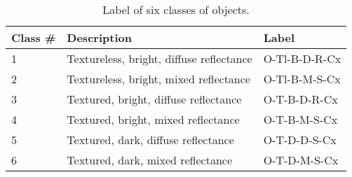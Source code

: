 \begin{table}[!htbp]
\centering
\begin{tabular}{ll|l}
\toprule
Class \# & Description & Label\\
\midrule
1 & Textureless, bright, diffuse reflectance & O-Tl-B-D-R-Cx\\
2 & Textureless, bright, mixed reflectance & O-Tl-B-M-S-Cx\\
3 & Textured, bright, diffuse reflectance & O-T-B-D-R-Cx\\
4 & Textured, bright, mixed reflectance & O-T-B-M-S-Cx\\
5 & Textured, dark, diffuse reflectance & O-T-D-D-S-Cx\\
6 & Textured, dark, mixed reflectance & O-T-D-M-S-Cx\\
\bottomrule
\end{tabular}
\caption{Label of six classes of objects.}
\label{tab:six_obj_class}
\end{table}

